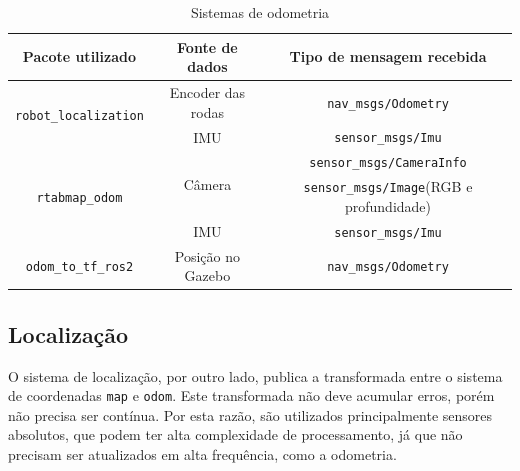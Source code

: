 \documentclass[repeatfields,xlists,xpacks,oneside,yearsonly]{ufrgscca}
\begin{document}
\begin{table}[h]
    \begin{center}
        \caption{Sistemas de odometria}
        \label{tab:odometria}
        \begin{tabular}{c|c|c}
            Pacote utilizado                              & Fonte de dados          & Tipo de mensagem recebida                       \\
            \hline
            \multirow{2}{*}{\texttt{robot\_localization}} & Encoder das rodas       & \texttt{nav\_msgs/Odometry}                     \\
                                                          & IMU                     & \texttt{sensor\_msgs/Imu}                       \\
            \hline
            \multirow{3}{*}{\texttt{rtabmap\_odom}}       & \multirow{2}{*}{Câmera} & \texttt{sensor\_msgs/CameraInfo}                \\
                                                          &                         & \texttt{sensor\_msgs/Image}(RGB e profundidade) \\
                                                          & IMU                     & \texttt{sensor\_msgs/Imu}                       \\
            \hline
            \texttt{odom\_to\_tf\_ros2}                   & Posição no Gazebo       & \texttt{nav\_msgs/Odometry}                     \\
        \end{tabular}
    \end{center}
\end{table}

\subsection{Localização}
\label{met:localizacao}

O sistema de localização, por outro lado, publica a transformada
entre o sistema de coordenadas \texttt{map} e \texttt{odom}. Este
transformada não deve acumular erros, porém não precisa ser contínua.
Por esta razão, são utilizados principalmente sensores absolutos, que
podem ter alta complexidade de processamento, já que não precisam ser
atualizados em alta frequência, como a odometria.
\end{document}
